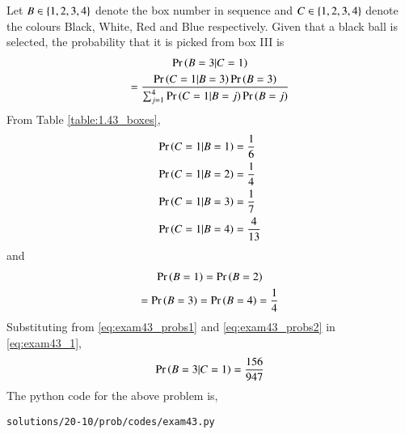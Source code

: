 Let $B \in \left\{1,2,3,4\right\}$ denote the box number in sequence and $C \in \left\{1,2,3,4\right\}$ denote the colours Black, White, Red and Blue respectively.
Given that a black ball is selected, the probability that it is picked from box III
is 
\begin{multline}
\Pr\left(B=3|C=1\right) 
\\
= \frac{\Pr\left( C=1|B=3\right)\Pr\left(B=3\right)}{\sum_{j=1}^{4}\Pr\left(C=1|B=j\right)\Pr\left(B=j\right)}
\label{eq:exam43_1}
\end{multline}
From Table \ref{table:1.43_boxes},
\begin{align}
\Pr\left(C=1|B=1\right) &= \frac{1}{6}
\\
\Pr\left(C=1|B=2\right) &= \frac{1}{4}
\\
\Pr\left(C=1|B=3\right) &= \frac{1}{7}
\\
\Pr\left(C=1|B=4\right) &= \frac{4}{13}
\label{eq:exam43_probs1}
\end{align}
and
\begin{multline}
\Pr\left(B=1\right)=\Pr\left(B=2\right)
\\
=\Pr\left(B=3\right)=\Pr\left(B=4\right) = \frac{1}{4}
\label{eq:exam43_probs2}
\end{multline}
Substituting from \eqref{eq:exam43_probs1} and \eqref{eq:exam43_probs2}
in \eqref{eq:exam43_1},
\begin{align}
\Pr\left(B=3|C=1\right)=\frac{156}{947}
\end{align}
The python code for the above problem is,
\begin{lstlisting}
solutions/20-10/prob/codes/exam43.py
\end{lstlisting}
